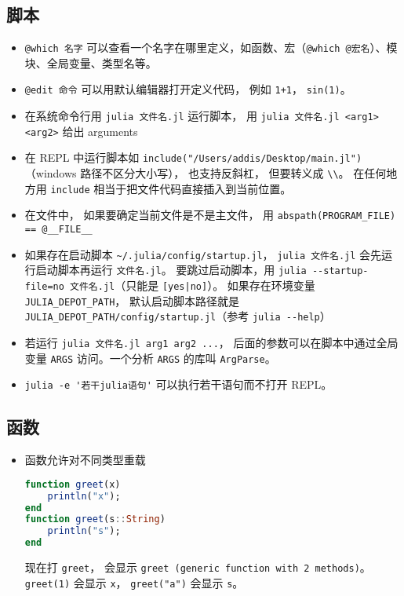 \subsection{脚本}
\begin{itemize}
\item \verb`@which 名字` 可以查看一个名字在哪里定义，如函数、宏（\verb`@which @宏名`）、模块、全局变量、类型名等。
\item \verb`@edit 命令` 可以用默认编辑器打开定义代码， 例如 \verb`1+1`， \verb`sin(1)`。
\item 在系统命令行用 \verb`julia 文件名.jl` 运行脚本， 用 \verb`julia 文件名.jl <arg1> <arg2>` 给出 arguments
\item 在 REPL 中运行脚本如 \verb`include("/Users/addis/Desktop/main.jl")`（windows 路径不区分大小写）， 也支持反斜杠， 但要转义成 \verb`\\`。 在任何地方用 \verb`include` 相当于把文件代码直接插入到当前位置。
\item 在文件中， 如果要确定当前文件是不是主文件， 用 \verb`abspath(PROGRAM_FILE) == @__FILE__`
\item 如果存在启动脚本 \verb`~/.julia/config/startup.jl`， \verb`julia 文件名.jl` 会先运行启动脚本再运行 \verb`文件名.jl`。 要跳过启动脚本，用 \verb`julia --startup-file=no 文件名.jl`（只能是 \verb`[yes|no]`）。 如果存在环境变量 \verb`JULIA_DEPOT_PATH`， 默认启动脚本路径就是 \verb`JULIA_DEPOT_PATH/config/startup.jl`（参考 \verb`julia --help`）
\item 若运行 \verb`julia 文件名.jl arg1 arg2 ...`， 后面的参数可以在脚本中通过全局变量 \verb`ARGS` 访问。一个分析 \verb`ARGS` 的库叫 \verb`ArgParse`。
\item \verb`julia -e '若干julia语句'` 可以执行若干语句而不打开 REPL。
\end{itemize}

\subsection{函数}
\begin{itemize}
\item 函数允许对不同类型重载
\begin{lstlisting}[language=julia]
function greet(x)
    println("x");
end
function greet(s::String)
    println("s");
end
\end{lstlisting}
现在打 \verb`greet`， 会显示 \verb`greet (generic function with 2 methods)`。 \verb`greet(1)` 会显示 \verb`x`， \verb`greet("a")` 会显示 \verb`s`。
\end{itemize}


